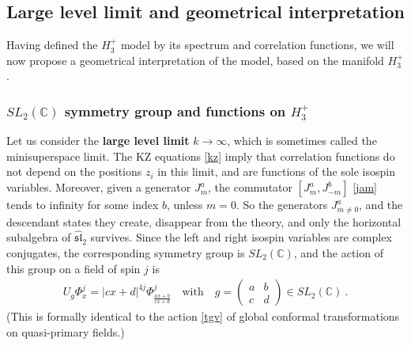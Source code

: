 \documentclass[12pt, a4paper, notitlepage, twoside]{report}
\numberwithin{equation}{section}
\theoremstyle{break}
\begin{document}
\subsection{Large level limit and geometrical interpretation}

Having defined the $H_3^+$ model by its spectrum and correlation functions, we will now propose a geometrical interpretation of the model, based on the manifold $H_3^+$.

\subsubsection{$SL_2({\mathbb{C}})$ symmetry group and functions on $H_3^+$}

Let us consider the \textbf{\boldmath large level limit} $k\to \infty$, which is sometimes called the minisuperspace limit. 
The KZ equations \eqref{kz} imply that correlation functions do not depend on the positions $z_i$ in this limit, and are functions of the sole isospin variables. 
Moreover, given a generator $J^a_m$, the commutator $[J^a_m,J^b_{-m}]$ \eqref{jam}  tends to infinity for some index $b$, unless $m=0$. 
So the generators $J^a_{m\neq 0}$, and the descendant states they create, disappear from the theory, and only the horizontal subalgebra of $\widehat{\mathfrak{sl}}_2$ survives.
Since the left and right isospin variables are complex conjugates, the corresponding symmetry group is $SL_2({\mathbb{C}})$, and the action of this group on a field of spin $j$ is 
\begin{align}
 U_g\Phi^j_{x} = |cx+d|^{4j}\Phi^j_{\frac{ax+b}{cx+d}} \quad \text{with} \quad g = \left(\begin{array}{cc} a & b \\ c & d \end{array}\right) \in SL_2({\mathbb{C}})\ .
\label{ugp}
\end{align}
(This is formally identical to the action \eqref{tgv} of global conformal transformations on quasi-primary fields.)
\end{document}
